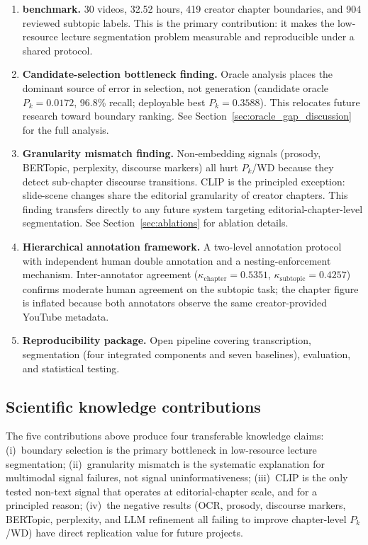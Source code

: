 \begin{enumerate}
  \item \textbf{\dataset{} benchmark.}
    30 videos, 32.52 hours, 419 creator chapter boundaries, and 904 reviewed
    subtopic labels.
    This is the primary contribution: it makes the low-resource lecture
    segmentation problem measurable and reproducible under a shared protocol.

  \item \textbf{Candidate-selection bottleneck finding.}
    Oracle analysis places the dominant source of error in selection, not
    generation (candidate oracle $P_k=0.0172$, 96.8\% recall; deployable best
    $P_k=0.3588$). This relocates future research toward boundary ranking.
    See Section~\ref{sec:oracle_gap_discussion} for the full analysis.

  \item \textbf{Granularity mismatch finding.}
    Non-embedding signals (prosody, BERTopic, perplexity, discourse markers)
    all hurt $P_k$/WD because they detect sub-chapter discourse transitions.
    CLIP is the principled exception: slide-scene changes share the editorial
    granularity of creator chapters. This finding transfers directly to any
    future system targeting editorial-chapter-level segmentation.
    See Section~\ref{sec:ablations} for ablation details.

  \item \textbf{Hierarchical annotation framework.}
    A two-level annotation protocol with independent human double annotation
    and a nesting-enforcement mechanism.
    Inter-annotator agreement ($\kappa_{\text{chapter}}=0.5351$,
    $\kappa_{\text{subtopic}}=0.4257$) confirms moderate human agreement
    on the subtopic task; the chapter figure is inflated because both
    annotators observe the same creator-provided YouTube metadata.

  \item \textbf{Reproducibility package.}
    Open pipeline covering transcription, segmentation (four integrated
    components and seven baselines), evaluation, and statistical testing.
\end{enumerate}

\subsection*{Scientific knowledge contributions}

The five contributions above produce four transferable knowledge claims:
(i)~boundary selection is the primary bottleneck in low-resource lecture
segmentation;
(ii)~granularity mismatch is the systematic explanation for multimodal signal
failures, not signal uninformativeness;
(iii)~CLIP is the only tested non-text signal that operates at editorial-chapter
scale, and for a principled reason;
(iv)~the negative results (OCR, prosody, discourse markers, BERTopic, perplexity,
and LLM refinement all failing to improve chapter-level $P_k$/WD) have direct
replication value for future projects.

